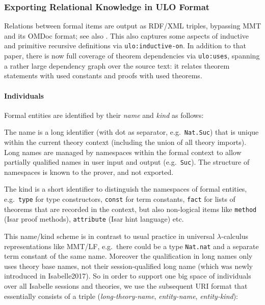 \subsubsection{Exporting Relational Knowledge in ULO Format}

Relations between formal items are output as RDF/XML triples,
  bypassing MMT and its OMDoc format; see also
  \cite[\S3.1]{CICM-2019:RDF}.  This also captures some aspects of
  inductive and primitive recursive definitions via
  \verb,ulo:inductive-on,. In addition to that paper, there is now
  full coverage of theorem dependencies via \verb,ulo:uses,, spanning
  a rather large dependency graph over the source text: it relates
  theorem statements with used constants and proofs with used
  theorems.  



\paragraph{Individuals}
Formal entities are identified by their \emph{name} and \emph{kind} as follows:
\begin{compactitem}
\item The name is a long identifier (with dot as separator, e.g.\ \texttt{Nat.Suc}) that is unique within the current theory context (including the union of all theory imports). Long names are managed by namespaces within the formal context to allow partially qualified names in user input and output (e.g.\ \texttt{Suc}). The structure of namespaces is known to the prover, and not exported.
\item The kind is a short identifier to distinguish the namespaces of formal entities, e.g.\ \texttt{type} for type constructors, \texttt{const} for term constants, \texttt{fact} for lists of theorems that are recorded in the context, but also non-logical items like \texttt{method} (Isar proof methods), \texttt{attribute} (Isar hint language) etc.
\end{compactitem}

\noindent
This name/kind scheme is in contrast to usual practice in universal $\lambda$-calculus representations like MMT/LF, e.g.\ there could be a type \texttt{Nat.nat} and a separate term constant of the same name.  Moreover the qualification in long names only uses theory base names, not their session-qualified long name (which was newly introduced in Isabelle2017). So in order to support one big space of individuals over all Isabelle sessions and theories, we use the subsequent URI format that essentially consists of a triple (\emph{long-theory-name}, \emph{entity-name}, \emph{entity-kind}):


